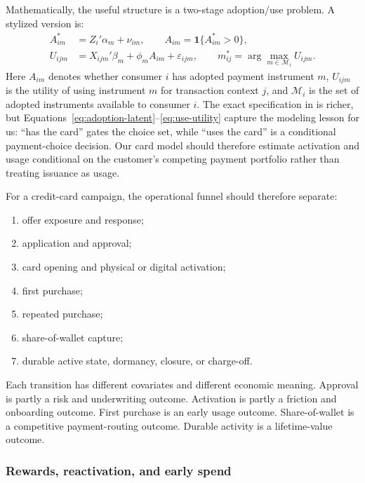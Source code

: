 \documentclass[11pt]{article}
\newcommand{\1}{\mathbf{1}}
\begin{document}
Mathematically, the useful structure is a two-stage adoption/use problem. A
stylized version is:
\begin{align}
  A_{im}^*
    &= Z_i'\alpha_m + \nu_{im}, \qquad
       A_{im} = \1\{A_{im}^*>0\}, \label{eq:adoption-latent}\\
  U_{ijm}
    &= X_{ijm}'\beta_m + \phi_m A_{im} + \varepsilon_{ijm},
       \qquad
       m^*_{ij}=\arg\max_{m \in \mathcal{M}_i} U_{ijm}.
       \label{eq:use-utility}
\end{align}
Here $A_{im}$ denotes whether consumer $i$ has adopted payment instrument $m$,
$U_{ijm}$ is the utility of using instrument $m$ for transaction context $j$,
and $\mathcal{M}_i$ is the set of adopted instruments available to consumer
$i$. The exact specification in \citet{koulayev2012payment} is richer, but
Equations~\eqref{eq:adoption-latent}--\eqref{eq:use-utility} capture the
modeling lesson for us: ``has the card'' gates the choice set, while ``uses the
card'' is a conditional payment-choice decision. Our card model should therefore
estimate activation and usage conditional on the customer's competing payment
portfolio rather than treating issuance as usage.

For a credit-card campaign, the operational funnel should therefore separate:
\begin{enumerate}[label=\arabic*.]
  \item offer exposure and response;
  \item application and approval;
  \item card opening and physical or digital activation;
  \item first purchase;
  \item repeated purchase;
  \item share-of-wallet capture;
  \item durable active state, dormancy, closure, or charge-off.
\end{enumerate}
Each transition has different covariates and different economic meaning.
Approval is partly a risk and underwriting outcome. Activation is partly a
friction and onboarding outcome. First purchase is an early usage outcome.
Share-of-wallet is a competitive payment-routing outcome. Durable activity is a
lifetime-value outcome.

\subsubsection{Rewards, reactivation, and early spend}
\end{document}
